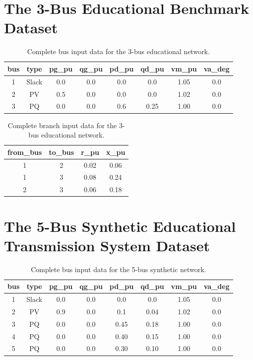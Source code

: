 \documentclass[12pt,a4paper,oneside]{report}
\begin{document}
\section{The 3-Bus Educational Benchmark Dataset}

\begin{table}[htbp]
\centering
\caption{Complete bus input data for the 3-bus educational network.}
\label{tab:app_3bus_buses}
\small
\begin{tabular}{cccccccc}
\toprule
\textbf{bus} & \textbf{type} & \textbf{pg\_pu} & \textbf{qg\_pu} & \textbf{pd\_pu} & \textbf{qd\_pu} & \textbf{vm\_pu} & \textbf{va\_deg} \\
\midrule
1 & Slack & 0.0 & 0.0 & 0.0 & 0.0 & 1.05 & 0.0 \\
2 & PV    & 0.5 & 0.0 & 0.0 & 0.0 & 1.02 & 0.0 \\
3 & PQ    & 0.0 & 0.0 & 0.6 & 0.25 & 1.00 & 0.0 \\
\bottomrule
\end{tabular}
\end{table}

\begin{table}[htbp]
\centering
\caption{Complete branch input data for the 3-bus educational network.}
\label{tab:app_3bus_lines}
\small
\begin{tabular}{cccc}
\toprule
\textbf{from\_bus} & \textbf{to\_bus} & \textbf{r\_pu} & \textbf{x\_pu} \\
\midrule
1 & 2 & 0.02 & 0.06 \\
1 & 3 & 0.08 & 0.24 \\
2 & 3 & 0.06 & 0.18 \\
\bottomrule
\end{tabular}
\end{table}

\section{The 5-Bus Synthetic Educational Transmission System Dataset}

\begin{table}[htbp]
\centering
\caption{Complete bus input data for the 5-bus synthetic network.}
\label{tab:app_5bus_buses}
\small
\begin{tabular}{cccccccc}
\toprule
\textbf{bus} & \textbf{type} & \textbf{pg\_pu} & \textbf{qg\_pu} & \textbf{pd\_pu} & \textbf{qd\_pu} & \textbf{vm\_pu} & \textbf{va\_deg} \\
\midrule
1 & Slack & 0.0 & 0.0 & 0.0 & 0.0 & 1.05 & 0.0 \\
2 & PV    & 0.9 & 0.0 & 0.1 & 0.04 & 1.02 & 0.0 \\
3 & PQ    & 0.0 & 0.0 & 0.45 & 0.18 & 1.00 & 0.0 \\
4 & PQ    & 0.0 & 0.0 & 0.40 & 0.15 & 1.00 & 0.0 \\
5 & PQ    & 0.0 & 0.0 & 0.30 & 0.10 & 1.00 & 0.0 \\
\bottomrule
\end{tabular}
\end{table}
\end{document}
